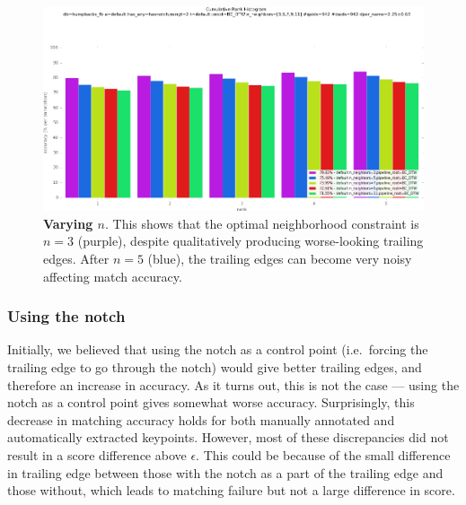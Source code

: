 \begin{figure}[t]%
\centering
\includegraphics[width=1\textwidth]{../images/results/vary_neighbors.png}
\caption{\textbf{Varying $n$}. This shows that the optimal neighborhood constraint is $n = 3$ (purple), despite qualitatively producing worse-looking trailing edges. After $n = 5$ (blue), the trailing edges can become very noisy affecting match accuracy.}
\label{fig:vary_neighbors}
\end{figure}

\subsubsection{Using the notch}

Initially, we believed that using the notch as a control point (i.e.\ forcing the trailing edge to go through the notch) would give better trailing edges, and therefore an increase in accuracy.
As it turns out, this is not the case --- using the notch as a control point gives somewhat worse accuracy.
Surprisingly, this decrease in matching accuracy holds for both manually annotated and automatically extracted keypoints.
However, most of these discrepancies did not result in a score difference above $\epsilon$.
This could be because of the small difference in trailing edge between those with the notch as a part of the trailing edge and those without, which leads to matching failure but not a large difference in score.


